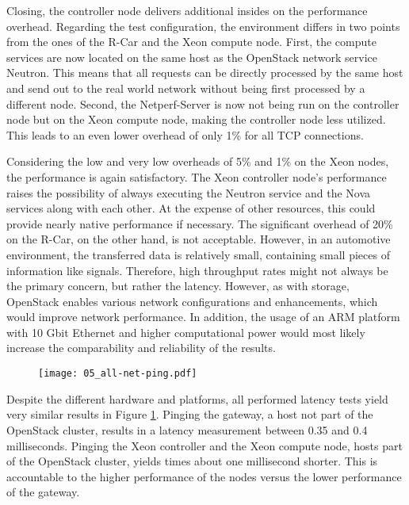             \noindent Closing, the controller node delivers additional insides on the performance overhead.
            Regarding the test configuration, the environment differs in two points from the ones of the R-Car and the Xeon compute node.
            First, the compute services are now located on the same host as the OpenStack network service Neutron.
            This means that all requests can be directly processed by the same host and send out to the real world network without being first processed by a different node.
            Second, the Netperf-Server is now not being run on the controller node but on the Xeon compute node, making the controller node less utilized.
            This leads to an even lower overhead of only 1\% for all TCP connections.
            
            \noindent Considering the low and very low overheads of 5\% and 1\% on the Xeon nodes, the performance is again satisfactory.
            The Xeon controller node's performance raises the possibility of always executing the Neutron service and the Nova services along with each other.
            At the expense of other resources, this could provide nearly native performance if necessary.
            The significant overhead of 20\% on the R-Car, on the other hand, is not acceptable.
            However, in an automotive environment, the transferred data is relatively small, containing small pieces of information like signals.
            Therefore, high throughput rates might not always be the primary concern, but rather the latency.
            However, as with storage, OpenStack enables various network configurations and enhancements, which would improve network performance.
            In addition, the usage of an ARM platform with 10 Gbit Ethernet and higher computational power would most likely increase the comparability and reliability of the results.
            
            \begin{figure}[ht]
              \centering
              \texttt{[image: 05\_all-net-ping.pdf]}
              \label{fig:all_net_ping}
            \end{figure}
            
            \noindent Despite the different hardware and platforms, all performed latency tests yield very similar results in Figure \ref{fig:all_net_ping}.
            Pinging the gateway, a host not part of the OpenStack cluster, results in a latency measurement between 0.35 and 0.4 milliseconds.
            Pinging the Xeon controller and the Xeon compute node, hosts part of the OpenStack cluster, yields times about one millisecond shorter.
            This is accountable to the higher performance of the nodes versus the lower performance of the gateway.
            
